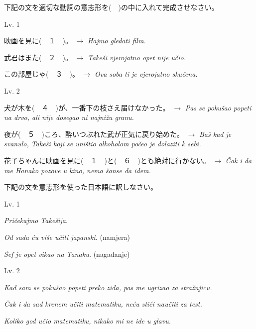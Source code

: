 
\author{Tomislav Mamić}

	
	\noindent
	下記の文を適切な動詞の意志形を(　)の中に入れて完成させなさい。
	
	\begin{mondai}{Lv. 1}
		\item 映画を見に(　１　)。 $\rightarrow$ \textit{Hajmo gledati film.}
		\item 武君はまた(　２　)。 $\rightarrow$ \textit{Takeši vjerojatno opet nije učio.}
		\item この部屋じゃ(　３　)。 $\rightarrow$ \textit{Ova soba ti je vjerojatno skučena.}
	\end{mondai}

	\begin{mondai}{Lv. 2}
		\item 犬が木を(　４　)が、一番下の枝さえ届けなかった。
		\newline$\rightarrow$ \textit{Pas se pokušao popeti na drvo, ali nije dosegao ni najnižu granu.}
		\item 夜が(　５　)ころ、酔いつぶれた武が正気に戻り始めた。
		\newline$\rightarrow$ \textit{Baš kad je svanulo, Takeši koji se uništio alkoholom počeo je dolaziti k sebi.}
		\item 花子ちゃんに映画を見に(　１　)と(　６　)とも絶対に行かない。
		\newline$\rightarrow$ \textit{Čak i da me Hanako pozove u kino, nema šanse da idem.}
	\end{mondai}

	\vspace{20pt}\noindent
	下記の文を意志形を使った日本語に訳しなさい。
	
	\begin{mondai}{Lv. 1}
		\item \textit{Pričekajmo Takešija.}
		\item \textit{Od sada ću više učiti japanski.} (namjera)
		\item \textit{Šef je opet vikao na Tanaku.} (nagađanje)
	\end{mondai}

	\begin{mondai}{Lv. 2}
		\item \textit{Kad sam se pokušao popeti preko zida, pas me ugrizao za stražnjicu.}
		\item \textit{Čak i da sad krenem učiti matematiku, neću stići naučiti za test.}
		\item \textit{Koliko god učio matematiku, nikako mi ne ide u glavu.}
	\end{mondai}
